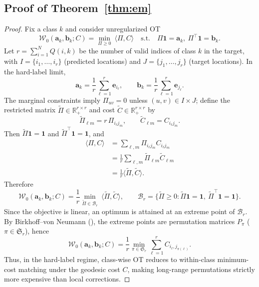\subsection{Proof of Theorem~\ref{thm:em}}
\label{proof:theorem_2}
\begin{proof}
Fix a class $k$ and consider unregularized OT
\begin{equation}
\mathcal{W}_{0}(\mathbf{a}_k,\mathbf{b}_k;C)
=
\min_{\Pi\ge 0}\ \langle \Pi, C\rangle
\quad
\text{s.t.}\quad
\Pi\mathbf{1}=\mathbf{a}_k,\ \Pi^\top\mathbf{1}=\mathbf{b}_k .
\label{eq:w0_def_em}
\end{equation}
Let $r=\sum_{i=1}^{N}Q(i,k)$ be the number of valid indices of class $k$ in the target, with $I=\{i_1,\ldots,i_r\}$ (predicted locations) and $J=\{j_1,\ldots,j_r\}$ (target locations). In the hard-label limit,
\begin{equation}
\mathbf{a}_k=\frac{1}{r}\sum_{\ell=1}^{r}\mathbf{e}_{i_\ell},
\qquad
\mathbf{b}_k=\frac{1}{r}\sum_{\ell=1}^{r}\mathbf{e}_{j_\ell}.
\label{eq:hard_masses_em}
\end{equation}
The marginal constraints imply $\Pi_{uv}=0$ unless $(u,v)\in I\times J$; define the restricted matrix $\widetilde{\Pi}\in\mathbb{R}_+^{r\times r}$ and cost $\widetilde{C}\in\mathbb{R}_+^{r\times r}$ by
\begin{equation}
\widetilde{\Pi}_{\ell m}=r\,\Pi_{i_\ell j_m},
\qquad
\widetilde{C}_{\ell m}=C_{i_\ell j_m}.
\label{eq:restrict_em}
\end{equation}
Then $\widetilde{\Pi}\mathbf{1}=\mathbf{1}$ and $\widetilde{\Pi}^\top\mathbf{1}=\mathbf{1}$, and
\begin{align}
\langle \Pi, C\rangle
&=
\sum_{\ell,m}\Pi_{i_\ell j_m}C_{i_\ell j_m} \\
&=
\frac{1}{r}\sum_{\ell,m}\widetilde{\Pi}_{\ell m}\widetilde{C}_{\ell m} \\
&=
\frac{1}{r}\langle \widetilde{\Pi},\widetilde{C}\rangle.
\label{eq:obj_reduce_em}
\end{align}
Therefore
\begin{equation}
\mathcal{W}_{0}(\mathbf{a}_k,\mathbf{b}_k;C)
=
\frac{1}{r}\min_{\widetilde{\Pi}\in\mathcal{B}_r}\ \langle \widetilde{\Pi},\widetilde{C}\rangle,
\qquad
\mathcal{B}_r=\{\widetilde{\Pi}\ge 0:\widetilde{\Pi}\mathbf{1}=\mathbf{1},\ \widetilde{\Pi}^\top\mathbf{1}=\mathbf{1}\}.
\label{eq:birkhoff_em}
\end{equation}
Since the objective is linear, an optimum is attained at an extreme point of $\mathcal{B}_r$. By Birkhoff--von Neumann (\citealt{von1953certain}), the extreme points are permutation matrices $P_\pi$ ($\pi\in\mathfrak{S}_r$), hence
\begin{equation}
\mathcal{W}_{0}(\mathbf{a}_k,\mathbf{b}_k;C)
=
\frac{1}{r}\min_{\pi\in\mathfrak{S}_r}\sum_{\ell=1}^{r} C_{i_\ell, j_{\pi(\ell)}}.
\label{eq:assignment_em}
\end{equation}
Thus, in the hard-label regime, class-wise OT reduces to within-class minimum-cost matching under the geodesic cost $C$, making long-range permutations strictly more expensive than local corrections.
\end{proof}






